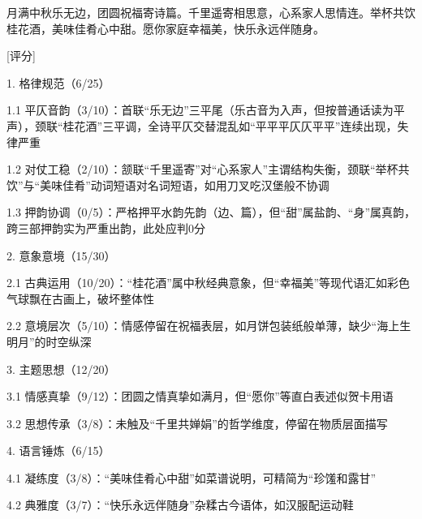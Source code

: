\begin{tcolorbox}[
  breakable,            %
  colback=white, %
  colframe=black, 
  boxrule=1pt,        %
  arc=0mm             %
  ]
  \kaishu 
  月满中秋乐无边，团圆祝福寄诗篇。千里遥寄相思意，心系家人思情连。举杯共饮桂花酒，美味佳肴心中甜。愿你家庭幸福美，快乐永远伴随身。

  \vspace{0.1em}
  \noindent\dotfill

  [评分]\par
  1. 格律规范（6/25）\par
  \hspace{2em}1.1 平仄音韵（3/10）：首联“乐无边”三平尾（乐古音为入声，但按普通话读为平声），颈联“桂花酒”三平调，全诗平仄交替混乱如“平平平仄仄平平”连续出现，失律严重\par
  \hspace{2em}1.2 对仗工稳（2/10）：颔联“千里遥寄”对“心系家人”主谓结构失衡，颈联“举杯共饮”与“美味佳肴”动词短语对名词短语，如用刀叉吃汉堡般不协调\par
  \hspace{2em}1.3 押韵协调（0/5）：严格押平水韵先韵（边、篇），但“甜”属盐韵、“身”属真韵，跨三部押韵实为严重出韵，此处应判0分\par

  2. 意象意境（15/30）\par
  \hspace{2em}2.1 古典运用（10/20）：“桂花酒”属中秋经典意象，但“幸福美”等现代语汇如彩色气球飘在古画上，破坏整体性\par
  \hspace{2em}2.2 意境层次（5/10）：情感停留在祝福表层，如月饼包装纸般单薄，缺少“海上生明月”的时空纵深\par

  3. 主题思想（12/20）\par
  \hspace{2em}3.1 情感真挚（9/12）：团圆之情真挚如满月，但“愿你”等直白表述似贺卡用语\par
  \hspace{2em}3.2 思想传承（3/8）：未触及“千里共婵娟”的哲学维度，停留在物质层面描写\par

  4. 语言锤炼（6/15）\par
  \hspace{2em}4.1 凝练度（3/8）：“美味佳肴心中甜”如菜谱说明，可精简为“珍馐和露甘”\par
  \hspace{2em}4.2 典雅度（3/7）：“快乐永远伴随身”杂糅古今语体，如汉服配运动鞋\par


\end{tcolorbox}
